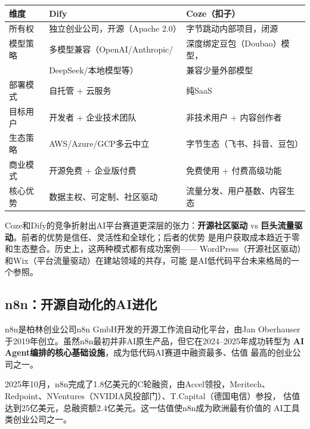 \begin{corebox}
\small
\begin{tabularx}{\textwidth}{l X X}
\toprule
\rowcolor{figLightGray}
\textbf{维度} & \textbf{Dify} & \textbf{Coze（扣子）} \\
\midrule
所有权     & 独立创业公司，开源（Apache 2.0）   & 字节跳动内部项目，闭源 \\
模型策略   & 多模型兼容（OpenAI/Anthropic/      & 深度绑定豆包（Doubao）模型， \\
           & DeepSeek/本地模型等）               & 兼容少量外部模型 \\
部署模式   & 自托管 + 云服务                    & 纯SaaS \\
目标用户   & 开发者 + 企业技术团队              & 非技术用户 + 内容创作者 \\
生态策略   & AWS/Azure/GCP多云中立              & 字节生态（飞书、抖音、豆包）\\
商业模式   & 开源免费 + 企业版付费              & 免费使用 + 付费高级功能 \\
核心优势   & 数据主权、可定制、社区驱动         & 流量分发、用户基数、内容生态 \\
\bottomrule
\end{tabularx}
\end{corebox}

Coze和Dify的竞争折射出AI平台赛道更深层的张力：\textbf{开源社区驱动}
vs \textbf{巨头流量驱动}。前者的优势是信任、灵活性和全球化；后者的优势
是用户获取成本趋近于零和生态整合。历史上，这两种模式都有成功案例——
WordPress（开源社区驱动）和Wix（平台流量驱动）在建站领域的共存，可能
是AI低代码平台未来格局的一个参照。

\subsection{n8n：开源自动化的AI进化}
\label{subsec:n8n}

n8n是柏林创业公司n8n GmbH开发的开源工作流自动化平台，由Jan Oberhauser
于2019年创立。虽然n8n最初并非AI原生产品，但它在2024--2025年成功转型为
\textbf{AI Agent编排的核心基础设施}，成为低代码AI赛道中融资最多、估值
最高的创业公司之一。

2025年10月，n8n完成了1.8亿美元的C轮融资，由Accel领投，Meritech、
Redpoint、NVentures（NVIDIA风投部门）、T.Capital（德国电信）参投，
估值达到25亿美元，总融资额2.4亿美元。这一估值使n8n成为欧洲最有价值的
AI工具类创业公司之一。

